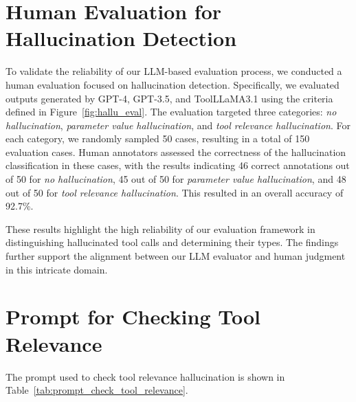 \section{Human Evaluation for Hallucination Detection}
\label{sec:human_eval}

To validate the reliability of our LLM-based evaluation process, we conducted a human evaluation focused on hallucination detection. Specifically, we evaluated outputs generated by GPT-4, GPT-3.5, and ToolLLaMA3.1 using the criteria defined in Figure~\ref{fig:hallu_eval}. The evaluation targeted three categories: \textit{no hallucination}, \textit{parameter value hallucination}, and \textit{tool relevance hallucination}. For each category, we randomly sampled 50 cases, resulting in a total of 150 evaluation cases. Human annotators assessed the correctness of the hallucination classification in these cases, with the results indicating 46 correct annotations out of 50 for \textit{no hallucination}, 45 out of 50 for \textit{parameter value hallucination}, and 48 out of 50 for \textit{tool relevance hallucination}. This resulted in an overall accuracy of 92.7\%.

These results highlight the high reliability of our evaluation framework in distinguishing hallucinated tool calls and determining their types. The findings further support the alignment between our LLM evaluator and human judgment in this intricate domain.




\section{Prompt for Checking Tool Relevance}
\label{sec:prompt_check_relevance}
The prompt used to check tool relevance hallucination is shown in Table~\ref{tab:prompt_check_tool_relevance}.


